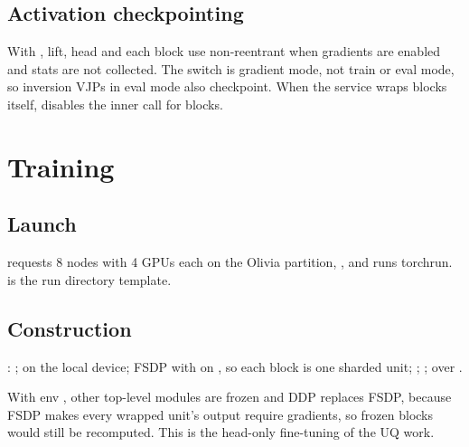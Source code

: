 \subsection{Activation checkpointing}
With , lift, head and each block use non-reentrant  when gradients are enabled and stats are not collected. The switch is gradient mode, not train or eval mode, so inversion VJPs in eval mode also checkpoint. When the service wraps blocks itself,  disables the inner call for blocks.

\section{Training}

\subsection{Launch}
 requests 8 nodes with 4 GPUs each on the Olivia  partition, , and runs torchrun.  is the run directory template.

\subsection{Construction}
: ;  on the local device; FSDP with  on , so each block is one sharded unit; ; ;  over .

With env , other top-level modules are frozen and DDP replaces FSDP, because FSDP makes every wrapped unit's output require gradients, so frozen blocks would still be recomputed. This is the head-only fine-tuning of the UQ work.

